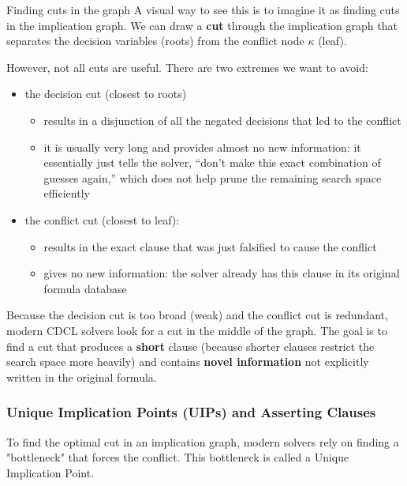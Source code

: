 \documentclass[a4paper, 11pt]{report}
\begin{document}
\begin{gframe}{Finding cuts in the graph}
    A visual way to see this is to imagine it as finding cuts in the implication graph. We can draw a \textbf{cut} through the implication graph that separates the decision variables (roots) from the conflict node $\kappa$ (leaf).

However, not all cuts are useful. There are two extremes we want to avoid:

\begin{itemize}
\item the decision cut (closest to roots)
    \begin{itemize}
        \item  results in a disjunction of all the negated decisions that led to the conflict
        \item it is usually very long and provides almost no new information: it essentially just tells the solver, ``don't make this exact combination of guesses again,'' which does not help prune the remaining search space efficiently
    \end{itemize}

    \item the conflict cut (closest to leaf):
    \begin{itemize}
        \item results in the exact clause that was just falsified to cause the conflict
        \item gives no new information: the solver already has this clause in its original formula database
    \end{itemize}
\end{itemize}

Because the decision cut is too broad (weak) and the conflict cut is redundant, modern CDCL solvers look for a cut in the middle of the graph. The goal is to find a cut that produces a \textbf{short} clause (because shorter clauses restrict the search space more heavily) and contains \textbf{novel information} not explicitly written in the original formula. 
\end{gframe}

\subsubsection{Unique Implication Points (UIPs) and Asserting Clauses}

To find the optimal cut in an implication graph, modern solvers rely on finding a "bottleneck" that forces the conflict. This bottleneck is called a Unique Implication Point.
\end{document}
